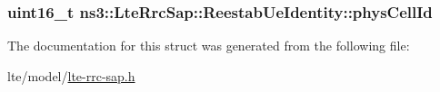 \subsubsection[{\texorpdfstring{phys\+Cell\+Id}{physCellId}}]{\setlength{\rightskip}{0pt plus 5cm}uint16\+\_\+t ns3\+::\+Lte\+Rrc\+Sap\+::\+Reestab\+Ue\+Identity\+::phys\+Cell\+Id}\hypertarget{structns3_1_1LteRrcSap_1_1ReestabUeIdentity_a90790c6986fc2f29df81220832eb4834}{}\label{structns3_1_1LteRrcSap_1_1ReestabUeIdentity_a90790c6986fc2f29df81220832eb4834}


The documentation for this struct was generated from the following file\+:\begin{DoxyCompactItemize}
\item 
lte/model/\hyperlink{lte-rrc-sap_8h}{lte-\/rrc-\/sap.\+h}\end{DoxyCompactItemize}
